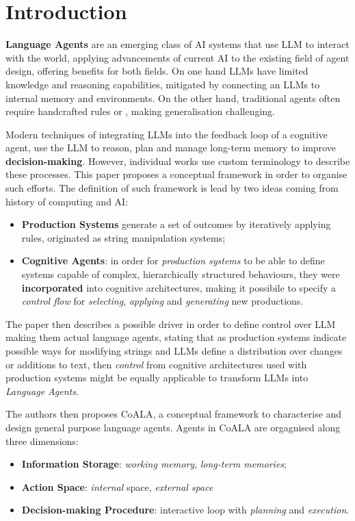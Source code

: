 \section{Introduction}\label{introduction}

\textbf{Language Agents} are an emerging class of AI systems that use \ac{LLM} to
interact with the world, applying advancements of current AI to the existing
field of agent design, offering benefits for both fields.
On one hand \ac{LLM}s have limited knowledge and reasoning capabilities,
mitigated by connecting an \ac{LLM}s to internal memory and environments. On the
other hand, traditional agents often require handcrafted rules or ,
making generalisation challenging.

Modern techniques of integrating \ac{LLM}s into the feedback loop of a
cognitive agent, use the \ac{LLM} to reason, plan and manage long-term memory
to improve \textbf{decision-making}. However, individual works use
custom terminology to describe these processes. This paper proposes a
conceptual framework in order to organise such efforts. The definition of such
framework is lead by two ideas coming from history of computing and AI:
\begin{itemize}
    \item \textbf{Production Systems} generate a set of outcomes by iteratively
    applying rules, originated as string manipulation systems;
    \item \textbf{Cognitive Agents}: in order for \emph{production systems} to
    be able to define systems capable of complex, hierarchically structured
    behaviours, they were \textbf{incorporated} into cognitive architectures,
    making it possibile to specify a \emph{control flow} for \emph{selecting},
    \emph{applying} and \emph{generating} new productions.
\end{itemize}

The paper then describes a possible driver in order to define control over \ac{LLM}
making them actual language agents, stating that as production systems indicate
possible ways for modifying strings and \ac{LLM}s define a distribution over changes
or additions to text, then \emph{control} from cognitive architectures used with
production systems might be equally applicable to transform \ac{LLM}s into
\emph{Language Agents}.

The authors then proposes \ac{CoALA}, a conceptual framework to characterise and
design general purpose language agents. Agents in CoALA are orgagnised along
three dimensions:
~\cite{sumers2024cognitivearchitectureslanguageagents}

\begin{itemize}
    \item \textbf{Information Storage}: \emph{working memory}, \emph{long-term memories};
    \item \textbf{Action Space}: \emph{internal} space, \emph{external space}
    \item \textbf{Decision-making Procedure}: interactive loop with \emph{planning} and \emph{execution}.
\end{itemize}
